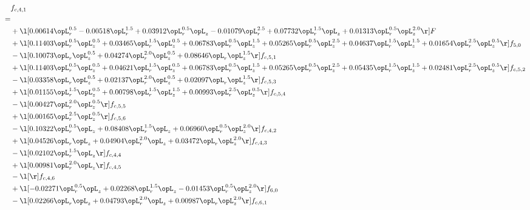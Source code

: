 \begin{alignat}{2} 
\label{eq:f_41_2} 
& f_{c,4,1} \nonumber \\ 
 = \\ 
& + \l[  0.00614 \opL_r^{0.5}   -0.00518 \opL_r^{1.5} +  0.03912 \opL_r^{0.5} \opL_z   -0.01079 \opL_r^{2.5} +  0.07732 \opL_r^{1.5} \opL_z +  0.01313 \opL_r^{0.5} \opL_z^{2.0}  \r] F \nonumber \\ 
& + \l[  0.11403 \opL_r^{0.5} \opL_z^{0.5} +  0.03465 \opL_r^{1.5} \opL_z^{0.5} +  0.06783 \opL_r^{0.5} \opL_z^{1.5} +  0.05265 \opL_r^{0.5} \opL_z^{2.5} +  0.04637 \opL_r^{1.5} \opL_z^{1.5} +  0.01654 \opL_r^{2.5} \opL_z^{0.5}  \r] f_{5,0} \nonumber \\ 
& - \l[  0.10073 \opL_r \opL_z^{0.5} +  0.04274 \opL_r^{2.0} \opL_z^{0.5} +  0.08646 \opL_r \opL_z^{1.5}  \r] f_{c,5,1} \nonumber \\ 
& + \l[  0.11403 \opL_r^{0.5} \opL_z^{0.5} +  0.04621 \opL_r^{1.5} \opL_z^{0.5} +  0.06783 \opL_r^{0.5} \opL_z^{1.5} +  0.05265 \opL_r^{0.5} \opL_z^{2.5} +  0.05435 \opL_r^{1.5} \opL_z^{1.5} +  0.02481 \opL_r^{2.5} \opL_z^{0.5}  \r] f_{c,5,2} \nonumber \\ 
& - \l[  0.03358 \opL_r \opL_z^{0.5} +  0.02137 \opL_r^{2.0} \opL_z^{0.5} +  0.02097 \opL_r \opL_z^{1.5}  \r] f_{c,5,3} \nonumber \\ 
& + \l[  0.01155 \opL_r^{1.5} \opL_z^{0.5} +  0.00798 \opL_r^{1.5} \opL_z^{1.5} +  0.00993 \opL_r^{2.5} \opL_z^{0.5}  \r] f_{c,5,4} \nonumber \\ 
& - \l[  0.00427 \opL_r^{2.0} \opL_z^{0.5}  \r] f_{c,5,5} \nonumber \\ 
& + \l[  0.00165 \opL_r^{2.5} \opL_z^{0.5}  \r] f_{c,5,6} \nonumber \\ 
& - \l[  0.10322 \opL_r^{0.5} \opL_z +  0.08408 \opL_r^{1.5} \opL_z +  0.06960 \opL_r^{0.5} \opL_z^{2.0}  \r] f_{c,4,2} \nonumber \\ 
& + \l[  0.04526 \opL_r \opL_z +  0.04904 \opL_r^{2.0} \opL_z +  0.03472 \opL_r \opL_z^{2.0}  \r] f_{c,4,3} \nonumber \\ 
& - \l[  0.02102 \opL_r^{1.5} \opL_z  \r] f_{c,4,4} \nonumber \\ 
& + \l[  0.00981 \opL_r^{2.0} \opL_z  \r] f_{c,4,5} \nonumber \\ 
& - \l[  \r] f_{c,4,6} \nonumber \\ 
& + \l[  -0.02271 \opL_r^{0.5} \opL_z +  0.02268 \opL_r^{1.5} \opL_z   -0.01453 \opL_r^{0.5} \opL_z^{2.0}  \r] f_{6,0} \nonumber \\ 
& - \l[  0.02266 \opL_r \opL_z +  0.04793 \opL_r^{2.0} \opL_z +  0.00987 \opL_r \opL_z^{2.0}  \r] f_{c,6,1} \nonumber \\ 

\end{alignat}
